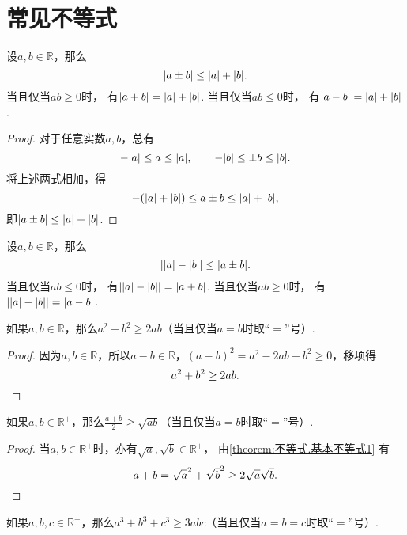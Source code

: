 \section{常见不等式}
\begin{theorem}[三角不等式I]\label{theorem:不等式.三角不等式1}
设\(a,b\in\mathbb{R}\)，那么\begin{equation}
	\abs{a \pm b}
	\leq
	\abs{a} + \abs{b}.
\end{equation}
当且仅当\(ab\geq0\)时，
有\(\abs{a+b}=\abs{a}+\abs{b}\).
当且仅当\(ab\leq0\)时，
有\(\abs{a-b}=\abs{a}+\abs{b}\).
\begin{proof}
对于任意实数\(a,b\)，总有\[
	-\abs{a} \leq a \leq \abs{a}, \qquad
	-\abs{b} \leq \pm b \leq \abs{b}.
\]
将上述两式相加，得\[
	-(\abs{a}+\abs{b}) \leq a \pm b \leq \abs{a}+\abs{b},
\]即\(\abs{a \pm b} \leq \abs{a}+\abs{b}\).
\end{proof}
\end{theorem}

\begin{theorem}[三角不等式II]\label{theorem:不等式.三角不等式2}
设\(a,b\in\mathbb{R}\)，那么\begin{equation}
	\abs{\abs{a}-\abs{b}}
	\leq
	\abs{a \pm b}.
\end{equation}
当且仅当\(ab\leq0\)时，
有\(\abs{\abs{a}-\abs{b}}=\abs{a+b}\).
当且仅当\(ab\geq0\)时，
有\(\abs{\abs{a}-\abs{b}}=\abs{a-b}\).
\end{theorem}

\begin{theorem}\label{theorem:不等式.基本不等式1}
如果\(a,b\in\mathbb{R}\)，那么\(a^2 + b^2 \geq 2ab\)（当且仅当\(a=b\)时取“\(=\)”号）.
\begin{proof}
因为\(a,b\in\mathbb{R}\)，所以\(a-b\in\mathbb{R}\)，\((a-b)^2 = a^2 - 2ab + b^2 \geq 0\)，移项得\[
a^2 + b^2 \geq 2ab.
\qedhere
\]
\end{proof}
\end{theorem}

\begin{corollary}\label{corollary:不等式.基本不等式2}
如果\(a,b\in\mathbb{R}^+\)，那么\(\frac{a+b}{2} \geq \sqrt{ab}\)（当且仅当\(a=b\)时取“\(=\)”号）.
\begin{proof}
当\(a,b\in\mathbb{R}^+\)时，亦有\(\sqrt{a},\sqrt{b}\in\mathbb{R}^+\)，
由\cref{theorem:不等式.基本不等式1} 有\[
a + b = \sqrt{a}^2 + \sqrt{b}^2 \geq 2\sqrt{a}\sqrt{b}.
\qedhere
\]
\end{proof}
\end{corollary}

\begin{theorem}\label{theorem:不等式.基本不等式3}
如果\(a,b,c\in\mathbb{R}^+\)，那么\(a^3 + b^3 + c^3 \geq 3abc\)（当且仅当\(a=b=c\)时取“\(=\)”号）.
\end{theorem}

